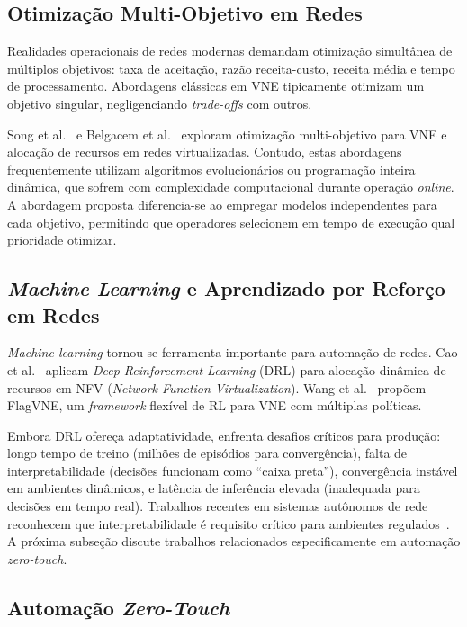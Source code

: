 \documentclass[conference]{IEEEtran}
\begin{document}
\subsection{Otimização Multi-Objetivo em Redes}
\label{subsec:multiobj-networks}

Realidades operacionais de redes modernas demandam otimização simultânea de múltiplos objetivos: taxa de aceitação, razão receita-custo, receita média e tempo de processamento. Abordagens clássicas em VNE tipicamente otimizam um objetivo singular, negligenciando \textit{trade-offs} com outros.

Song et al.~\cite{song2020multiobjective} e Belgacem et al.~\cite{belgacem2016multiobjective} exploram otimização multi-objetivo para VNE e alocação de recursos em redes virtualizadas. Contudo, estas abordagens frequentemente utilizam algoritmos evolucionários ou programação inteira dinâmica, que sofrem com complexidade computacional durante operação \textit{online}. A abordagem proposta diferencia-se ao empregar modelos independentes para cada objetivo, permitindo que operadores selecionem em tempo de execução qual prioridade otimizar.

\subsection{\textit{Machine Learning} e Aprendizado por Reforço em Redes}
\label{subsec:ml-networks}

\textit{Machine learning} tornou-se ferramenta importante para automação de redes.
Cao et al.~\cite{cao2018nfv-deeprl} aplicam \textit{Deep Reinforcement Learning} (DRL) para alocação dinâmica de recursos em NFV (\textit{Network Function Virtualization}).
Wang et al.~\cite{ijcai-2024-flagvne} propõem FlagVNE, um \textit{framework} flexível de RL para VNE com múltiplas políticas.

Embora DRL ofereça adaptatividade, enfrenta desafios críticos para produção: longo tempo de treino (milhões de episódios para convergência), falta de interpretabilidade (decisões funcionam como ``caixa preta''), convergência instável em ambientes dinâmicos, e latência de inferência elevada (inadequada para decisões em tempo real).
Trabalhos recentes em sistemas autônomos de rede reconhecem que interpretabilidade é requisito crítico para ambientes regulados~\cite{white2024zerotough}. A próxima subseção discute trabalhos relacionados especificamente em automação \textit{zero-touch}.

\subsection{Automação \textit{Zero-Touch}}
\label{subsec:zerotouchj}
\end{document}
